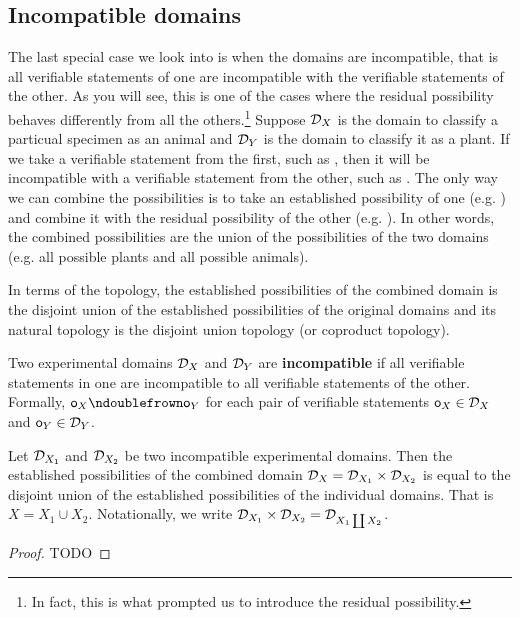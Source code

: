 \documentclass[11pt,letterpaper,fleqn]{memoir} %
\begin{document}
\subsection{Incompatible domains}

The last special case we look into is when the domains are incompatible, that is all verifiable statements of one are incompatible with the verifiable statements of the other. As you will see, this is one of the cases where the residual possibility behaves differently from all the others.\footnote{In fact, this is what prompted us to introduce the residual possibility.} Suppose $\mathcal{D}_X$ is the domain to classify a particual specimen as an animal and $\mathcal{D}_Y$ is the domain to classify it as a plant. If we take a verifiable statement from the first, such as , then it will be incompatible with a verifiable statement from the other, such as . The only way we can combine the possibilities is to take an established possibility of one (e.g. ) and combine it with the residual possibility of the other (e.g. ). In other words, the combined possibilities are the union of the possibilities of the two domains (e.g. all possible plants and all possible animals).

In terms of the topology, the established possibilities of the combined domain is the disjoint union of the established possibilities of the original domains and its natural topology is the disjoint union topology (or coproduct topology). 

\begin{mathSection}
	\begin{defn}
		Two experimental domains $\mathcal{D}_X$ and $\mathcal{D}_Y$ are \textbf{incompatible} if all verifiable statements in one are incompatible to all verifiable statements of the other. Formally, $\obs_X \ncomp \obs_Y$ for each pair of verifiable statements $\mathsf{o}_X \in \mathcal{D}_X$ and $\mathsf{o}_Y \in \mathcal{D}_Y$.
	\end{defn}
	\begin{prop}
		Let $\mathcal{D}_{X_1}$ and $\mathcal{D}_{X_2}$ be two incompatible experimental domains. Then the established possibilities of the combined domain $\mathcal{D}_X = \mathcal{D}_{X_1} \times \mathcal{D}_{X_2}$ is equal to the disjoint union of the established possibilities of the individual domains. That is $X = X_1 \cup X_2$. Notationally, we write $\mathcal{D}_{X_1} \times \mathcal{D}_{X_2} = \mathcal{D}_{X_1 \coprod X_2}$.
	\end{prop}
	\begin{proof}
		TODO
	\end{proof}
\end{mathSection}
\end{document}

